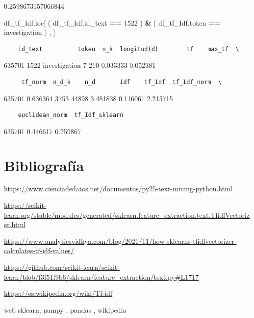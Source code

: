 \documentclass[
  11pt,
  a4paper,
]{article}
\newenvironment{Shaded}{\begin{snugshade}}{\end{snugshade}}
\newcommand{\DecValTok}[1]{\textcolor[rgb]{0.00,0.00,0.81}{#1}}
\newcommand{\NormalTok}[1]{#1}
\newcommand{\OperatorTok}[1]{\textcolor[rgb]{0.81,0.36,0.00}{\textbf{#1}}}
\newcommand{\StringTok}[1]{\textcolor[rgb]{0.31,0.60,0.02}{#1}}
\begin{document}
0.2598673157066844

\begin{Shaded}
\begin{Highlighting}[]
\NormalTok{df\_tf\_Idf.loc[ ( df\_tf\_Idf.id\_text }\OperatorTok{==} \DecValTok{1522}\NormalTok{ ) }\OperatorTok{\&}\NormalTok{  ( df\_tf\_Idf.token }\OperatorTok{==} \StringTok{\textquotesingle{}investigation\textquotesingle{}}\NormalTok{ ) , ]}
\end{Highlighting}
\end{Shaded}

\begin{verbatim}
    id_text          token  n_k  longitud(d)        tf    max_tf  \
\end{verbatim}

635701 1522 investigation 7 210 0.033333 0.052381

\begin{verbatim}
     tf_norm  n_d_k    n_d       Idf    tf_Idf  tf_Idf_norm  \
\end{verbatim}

635701 0.636364 3753 44898 3.481838 0.116061 2.215715

\begin{verbatim}
    euclidean_norm  tf_Idf_sklearn  
\end{verbatim}

635701 0.446617 0.259867

\newpage

\hypertarget{bibliografuxeda}{%
\section{Bibliografía}\label{bibliografuxeda}}

\url{https://www.cienciadedatos.net/documentos/py25-text-mining-python.html}

\url{https://scikit-learn.org/stable/modules/generated/sklearn.feature_extraction.text.TfidfVectorizer.html}

\url{https://www.analyticsvidhya.com/blog/2021/11/how-sklearns-tfidfvectorizer-calculates-tf-idf-values/}

\url{https://github.com/scikit-learn/scikit-learn/blob/f3f51f9b6/sklearn/feature_extraction/text.py\#L1717}

\url{https://es.wikipedia.org/wiki/Tf-idf}

web sklearn, numpy , pandas , wikipedia
\end{document}
